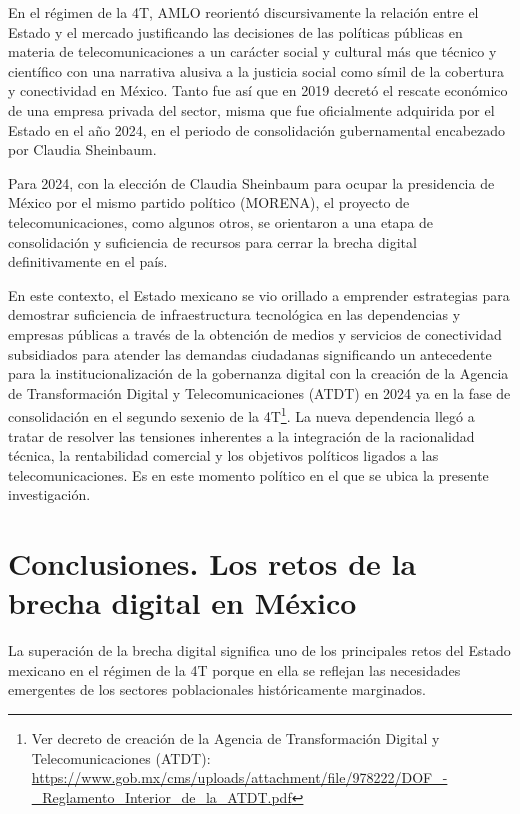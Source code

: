 \documentclass[
  spanish,
  11pt,
  a4paper,
]{scrbook}
\begin{document}
En el régimen de la 4T, AMLO reorientó discursivamente la relación entre
el Estado y el mercado justificando las decisiones de las políticas
públicas en materia de telecomunicaciones a un carácter social y
cultural más que técnico y científico con una narrativa alusiva a la
justicia social como símil de la cobertura y conectividad en México.
Tanto fue así que en 2019 decretó el rescate económico de una empresa
privada del sector, misma que fue oficialmente adquirida por el Estado
en el año 2024, en el periodo de consolidación gubernamental encabezado
por Claudia Sheinbaum.

Para 2024, con la elección de Claudia Sheinbaum para ocupar la
presidencia de México por el mismo partido político (MORENA), el
proyecto de telecomunicaciones, como algunos otros, se orientaron a una
etapa de consolidación y suficiencia de recursos para cerrar la brecha
digital definitivamente en el país.

En este contexto, el Estado mexicano se vio orillado a emprender
estrategias para demostrar suficiencia de infraestructura tecnológica en
las dependencias y empresas públicas a través de la obtención de medios
y servicios de conectividad subsidiados para atender las demandas
ciudadanas significando un antecedente para la institucionalización de
la gobernanza digital con la creación de la Agencia de Transformación
Digital y Telecomunicaciones (ATDT) en 2024 ya en la fase de
consolidación en el segundo sexenio de la 4T\footnote{Ver decreto de
  creación de la Agencia de Transformación Digital y Telecomunicaciones
  (ATDT):
  \url{https://www.gob.mx/cms/uploads/attachment/file/978222/DOF_-_Reglamento_Interior_de_la_ATDT.pdf}}.
La nueva dependencia llegó a tratar de resolver las tensiones inherentes
a la integración de la racionalidad técnica, la rentabilidad comercial y
los objetivos políticos ligados a las telecomunicaciones. Es en este
momento político en el que se ubica la presente investigación.

\section*{Conclusiones. Los retos de la brecha digital en
México}\label{conclusiones.-los-retos-de-la-brecha-digital-en-muxe9xico}


La superación de la brecha digital significa uno de los principales
retos del Estado mexicano en el régimen de la 4T porque en ella se
reflejan las necesidades emergentes de los sectores poblacionales
históricamente marginados.
\end{document}

